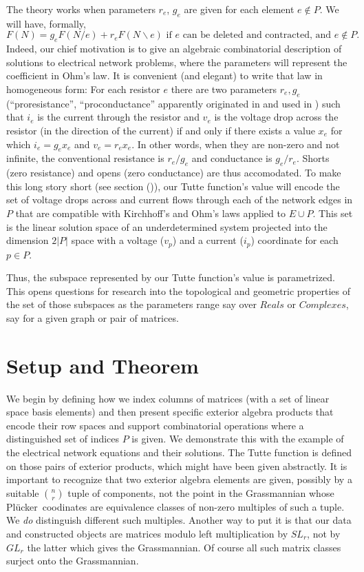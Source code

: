 \documentclass[Unicode]{cedram-alco}
\newcommand{\Plucker}{Pl\"{u}cker\ }
\begin{document}
The theory works when parameters $r_e$, $g_e$ are given for each element $e\not\in P$. We
will have, formally,
\[
   F(N) = g_eF(N/e)+r_eF(N\backslash e) \text{ if\ }e\text{ can be deleted and contracted, and }e\not\in P.
   \]
Indeed, our chief motivation is to give an algebraic combinatorial description of solutions
to electrical network problems, where the parameters will represent the coefficient
in Ohm's law.  It is convenient (and elegant) to write that law in homogeneous form:
For each resistor $e$ there
are two parameters $r_e,g_e$
(``proresistance'', ``proconductance'' apparently originated in \cite{SmithElec} and  used in
\cite{TutteEx,CirThProjHomo2019}) such that $i_e$ is the current through the resistor and $v_e$ is
the voltage drop across the resistor (in the direction of the current) if and only if there
exists a value $x_e$ for which $i_e=g_ex_e$ and $v_e=r_ex_e$.  In other words, when they
are non-zero and not infinite, the conventional
resistance is $r_e/g_e$ and conductance is $g_e/r_e$. Shorts (zero resistance) and opens (zero
conductance) are thus accomodated.   To make this long story short (see section ()),
our Tutte function's value
will encode the set of voltage drops across and current flows through each of
the network edges in $P$ that are compatible with Kirchhoff's and Ohm's laws applied to $E\cup P$. This set
is the linear solution space of an underdetermined system projected into the
dimension $2|P|$ space with a voltage ($v_{p}$) and a current ($i_{p}$) coordinate for each $p\in P$.

Thus, the subspace represented by our Tutte function's value is parametrized.  This opens
questions for research into the topological and geometric properties of the set of those subspaces
as the parameters range say over $Reals$ or $Complexes$, say for a given graph or pair of
matrices.



\section{Setup and Theorem}

\noindent
We begin by defining how we index columns of matrices (with a set of
linear space basis elements) and then
present specific
exterior algebra products that encode their row spaces and support
combinatorial operations where a distinguished set of indices $P$ is given.
We demonstrate this with the example
of the electrical network equations and their solutions.
The Tutte function is defined
on those pairs of exterior products, which might have been given abstractly.
It is important to recognize that two exterior algebra elements are given,
possibly by a suitable $\binom{n}{r}$ tuple of components, not the point in the Grassmannian
whose \Plucker coodinates are equivalence classes of non-zero multiples of
such a tuple.  We \emph{do} distinguish different such multiples.  Another way
to put it is that our data and constructed objects are matrices modulo left multiplication
by $SL_r$, not by $GL_r$ the latter which gives the Grassmannian.  Of course all such matrix
classes surject onto the Grassmannian.
\end{document}

